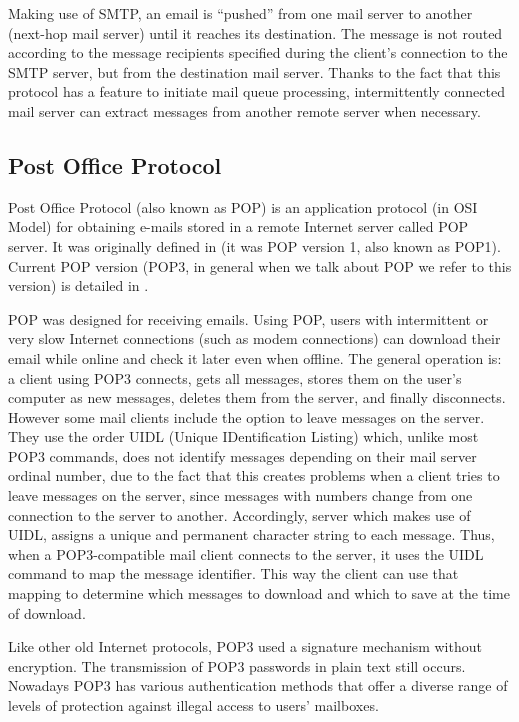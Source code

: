 Making use of SMTP, an email is ``pushed'' from one mail server to another (next-hop mail server) until it reaches its destination. The message is not routed according to the message recipients specified during the client's connection to the SMTP server, but from the destination mail server. Thanks to the fact that this protocol has a feature to initiate mail queue processing, intermittently connected mail server can extract messages from another remote server when necessary.

\subsection{Post Office Protocol} \label{ssect:pop}

Post Office Protocol (also known as POP) is an application protocol (in OSI Model) for obtaining e-mails stored in a remote Internet server called POP server. It was originally defined in \cite{rfc918} (it was POP version 1, also known as POP1). Current POP version (POP3, in general when we talk about POP we refer to this version) is detailed in \cite{rfc1939}.

POP was designed for receiving emails. Using POP, users with intermittent or very slow Internet connections (such as modem connections) can download their email while online and check it later even when offline. The general operation is: a client using POP3 connects, gets all messages, stores them on the user's computer as new messages, deletes them from the server, and finally disconnects. However some mail clients include the option to leave messages on the server. They use the order UIDL (Unique IDentification Listing) which, unlike most POP3 commands, does not identify messages depending on their mail server ordinal number, due to the fact that this creates problems when a client tries to leave messages on the server, since messages with numbers change from one connection to the server to another. Accordingly, server which makes use of UIDL, assigns a unique and permanent character string to each message. Thus, when a POP3-compatible mail client connects to the server, it uses the UIDL command to map the message identifier. This way the client can use that mapping to determine which messages to download and which to save at the time of download.

Like other old Internet protocols, POP3 used a signature mechanism without encryption. The transmission of POP3 passwords in plain text still occurs. Nowadays POP3 has various authentication methods that offer a diverse range of levels of protection against illegal access to users' mailboxes.


